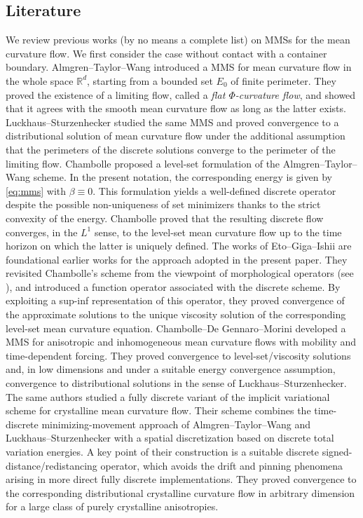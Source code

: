 \documentclass[11pt]{article}
\numberwithin{equation}{section}
\begin{document}
\subsection{Literature}

We review previous works (by no means a complete list) on MMSs for the mean curvature flow. 
We first consider the case without contact with a container boundary.
Almgren--Taylor--Wang \cite{Almgren93} introduced a MMS for mean curvature flow in the whole space $\mathbb{R}^d$, starting from a bounded set $E_0$ of finite perimeter.  They proved the existence of a limiting flow, called a \textit{flat $\Phi$-curvature flow}, and showed that it agrees with the smooth mean curvature flow as long as the latter exists.
Luckhaus--Sturzenhecker \cite{LS95} studied the same MMS and proved convergence to a distributional solution of mean curvature flow under the additional assumption that the perimeters of the discrete solutions converge to the perimeter of the limiting flow.
Chambolle \cite{Chambolle04} proposed a level-set formulation of the Almgren--Taylor--Wang scheme.  In the present notation, the corresponding energy is given by \eqref{eq:mms} with $\beta\equiv 0$.  This formulation yields a well-defined discrete operator despite the possible non-uniqueness of set minimizers thanks to the strict convexity of the energy.
Chambolle proved that the resulting discrete flow converges, in the $L^1$ sense, to the level-set mean curvature flow up to the time horizon on which the latter is uniquely defined.
The works of Eto--Giga--Ishii \cite{EGI12-1,EGI12-2} are foundational earlier works for the approach adopted in the present paper.  They revisited Chambolle's scheme from the viewpoint of morphological operators (see \cite{C03}), and introduced a function operator associated with the discrete scheme.  By exploiting a sup-inf representation of this operator, they proved convergence of the approximate solutions to the unique viscosity solution of the corresponding level-set mean curvature equation.
Chambolle--De Gennaro--Morini \cite{CDM24} developed a MMS for anisotropic and inhomogeneous mean curvature flows with mobility and time-dependent forcing.  They proved convergence to level-set/viscosity solutions and, in low dimensions and under a suitable energy convergence assumption, convergence to distributional solutions in the sense of Luckhaus--Sturzenhecker.
The same authors \cite{CDGM26} studied a fully discrete variant of the implicit variational scheme for crystalline mean curvature flow.  Their scheme combines the time-discrete minimizing-movement approach of Almgren--Taylor--Wang and Luckhaus--Sturzenhecker with a spatial discretization based on discrete total variation energies.  A key point of their construction is a suitable discrete signed-distance/redistancing operator, which avoids the drift and pinning phenomena arising in more direct fully discrete implementations.  They proved convergence to the corresponding distributional crystalline curvature flow in arbitrary dimension for a large class of purely crystalline anisotropies.
\end{document}
